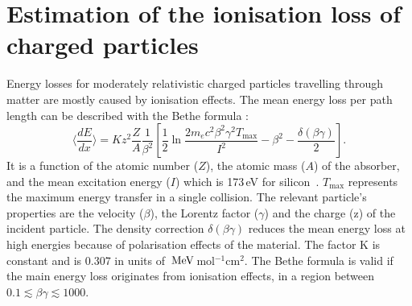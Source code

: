 

\section{Estimation of the ionisation loss of charged particles}
\label{sec:sub:MeasuringDeDx}
Energy losses for moderately relativistic charged particles travelling through matter are mostly caused by ionisation effects.
The mean energy loss per path length can be described with the Bethe formula \cite{bib:Bethe_1930}:
\begin{equation}
\langle \frac{dE}{dx} \rangle = Kz^2\frac{Z}{A}\frac{1}{\beta^2} [ \frac{1}{2} \ln{\frac{2m_e c^2 \beta^2 \gamma^2 T_{\text{max}}}{I^2}} - \beta^2 - \frac{\delta( \beta \gamma )}{2} ].
\end{equation}
It is a function of the atomic number ($Z$), the atomic mass ($A$) of the absorber, and the mean excitation energy ($I$) which is 173\,eV for silicon~\cite{bib:NIST}.  
$T_{\text{max}}$ represents the maximum energy transfer in a single collision.
The relevant particle's properties are the velocity ($\beta$), the Lorentz factor ($\gamma$) and the charge (z) of the incident particle.
The density correction $\delta( \beta \gamma )$ reduces the mean energy loss at high energies because of polarisation effects of the material. 
The factor K is constant and is 0.307 in units of $\,\text{Me}\kern-0.06667em\text{V}\,$mol$^{-1}$cm$^2$.
The Bethe formula is valid if the main energy loss originates from ionisation effects, \ie in a region between $0.1\lesssim\beta\gamma\lesssim 1000$.


